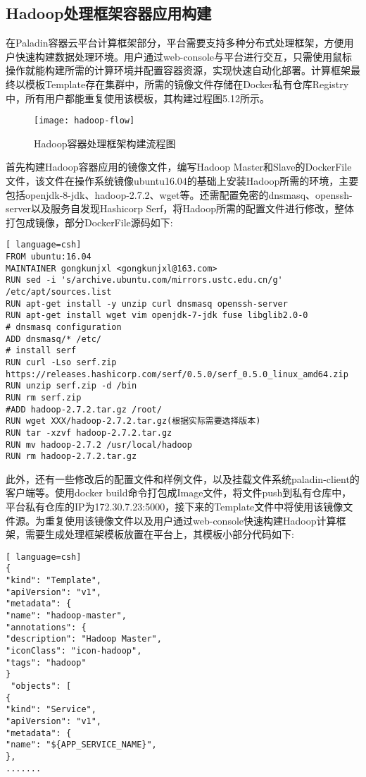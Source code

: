 \subsection{Hadoop处理框架容器应用构建}
在Paladin容器云平台计算框架部分，平台需要支持多种分布式处理框架，方便用户快速构建数据处理环境。用户通过web-console与平台进行交互，只需使用鼠标操作就能构建所需的计算环境并配置容器资源，实现快速自动化部署。计算框架最终以模板Template存在集群中，所需的镜像文件存储在Docker私有仓库Registry中，所有用户都能重复使用该模板，其构建过程图5.12所示。
\begin{figure}[H] %
	\centering
	\texttt{[image: hadoop-flow]}
	\caption{Hadoop容器处理框架构建流程图}
\end{figure}

首先构建Hadoop容器应用的镜像文件，编写Hadoop Master和Slave的DockerFile文件，该文件在操作系统镜像ubuntu16.04的基础上安装Hadoop所需的环境，主要包括openjdk-8-jdk、hadoop-2.7.2、wget等。还需配置免密的dnsmasq、openssh-server以及服务自发现Hashicorp Serf，将Hadoop所需的配置文件进行修改，整体打包成镜像，部分DockerFile源码如下:
\begin{lstlisting}[ language=csh]
FROM ubuntu:16.04
MAINTAINER gongkunjxl <gongkunjxl@163.com>
RUN sed -i 's/archive.ubuntu.com/mirrors.ustc.edu.cn/g' /etc/apt/sources.list
RUN apt-get install -y unzip curl dnsmasq openssh-server
RUN apt-get install wget vim openjdk-7-jdk fuse libglib2.0-0
# dnsmasq configuration
ADD dnsmasq/* /etc/
# install serf
RUN curl -Lso serf.zip https://releases.hashicorp.com/serf/0.5.0/serf_0.5.0_linux_amd64.zip
RUN unzip serf.zip -d /bin 
RUN rm serf.zip
#ADD hadoop-2.7.2.tar.gz /root/
RUN wget XXX/hadoop-2.7.2.tar.gz(根据实际需要选择版本)
RUN tar -xzvf hadoop-2.7.2.tar.gz
RUN mv hadoop-2.7.2 /usr/local/hadoop
RUN rm hadoop-2.7.2.tar.gz
\end{lstlisting}

此外，还有一些修改后的配置文件和样例文件，以及挂载文件系统paladin-client的客户端等。使用docker build命令打包成Image文件，将文件push到私有仓库中，平台私有仓库的IP为172.30.7.23:5000，接下来的Template文件中将使用该镜像文件源。为重复使用该镜像文件以及用户通过web-console快速构建Hadoop计算框架，需要生成处理框架模板放置在平台上，其模板小部分代码如下:
\begin{lstlisting}[ language=csh]
{
"kind": "Template",
"apiVersion": "v1",
"metadata": {
"name": "hadoop-master",
"annotations": {
"description": "Hadoop Master",
"iconClass": "icon-hadoop",
"tags": "hadoop"
}
 "objects": [
{
"kind": "Service",
"apiVersion": "v1",
"metadata": {
"name": "${APP_SERVICE_NAME}",
},
.......
\end{lstlisting}

